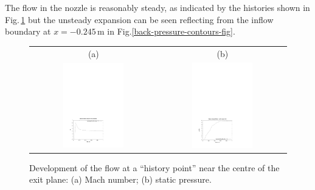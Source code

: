 The flow in the nozzle is reasonably steady, as indicated by the histories
shown in Fig.\,\ref{back-transient-fig} but the unsteady expansion can 
be seen reflecting from the inflow boundary at $x = -0.245$\,m 
in Fig.\ref{back-pressure-contours-fig}.

\begin{figure}[htbp]
\begin{center}
\begin{tabular}{cc}
(a) & (b) \\
\includegraphics[width=0.5\textwidth,viewport=65 52 398 291,clip=true]{../2D/back-nozzle/back_history_M.pdf} &
\includegraphics[width=0.5\textwidth,viewport=65 52 398 291,clip=true]{../2D/back-nozzle/back_history_p.pdf}
\end{tabular}
\end{center}
\caption{Development of the flow at a ``history point'' near
         the centre of the exit plane:
         (a) Mach number;
         (b) static pressure.}
\label{back-transient-fig}
\end{figure}

